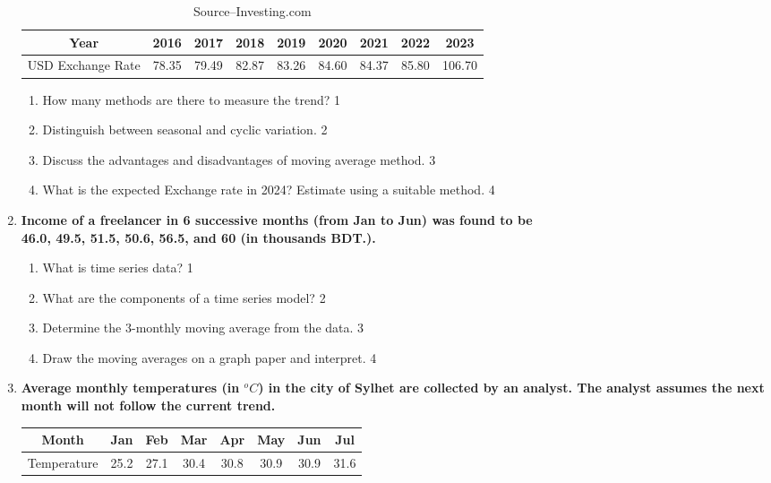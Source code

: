 \documentclass[a4paper,oneside]{book}
\begin{document}
\begin{enumerate}
  \begin{table}[h]
  \centering
\begin{tabular}{c|c|c|c|c|c|c|c|c}
Year & 2016 & 2017 & 2018 & 2019 & 2020 & 2021 & 2022 & 2023 \\ \hline
USD Exchange Rate & 78.35 & 79.49 & 82.87 & 83.26 & 84.60 & 84.37 & 85.80 & 106.70
\end{tabular}
\caption{\label{usdrate}Source--Investing.com}
\end{table}
  
  
  \begin{enumerate}
    \item
	How many methods are there to measure the trend? \hfill 1
    \item
	Distinguish between seasonal and cyclic variation. \hfill 2
    \item  
	Discuss the advantages and disadvantages of moving average method. \hfill 3
    \item
	What is the expected Exchange rate in 2024? Estimate using a suitable method. \hfill 4
  \end{enumerate}

 \item
	  \textbf{Income of a freelancer in 6 successive months (from Jan to Jun) was found to be \\ 46.0, 49.5, 51.5, 50.6, 56.5, and 60 (in thousands BDT.).}
  \begin{enumerate}
    \item
	What is time series data? \hfill 1
    \item
	What are the components of a time series model? \hfill 2
    \item  
	Determine the 3-monthly moving average from the data. \hfill 3
    \item
	Draw the moving averages on a graph paper and interpret. \hfill 4
\end{enumerate}

 \item
	  \textbf{Average monthly temperatures (in $^o C$) in the city of Sylhet are collected by an analyst. The analyst assumes the next month will not follow the current trend.} 
	  
	  \begin{table}[h]
	  \centering
\begin{tabular}{c|c|c|c|c|c|c|c}
Month & Jan & Feb & Mar & Apr & May & Jun & Jul \\ \hline
Temperature & 25.2 & 27.1 & 30.4 & 30.8 & 30.9 & 30.9 & 31.6
\end{tabular}
\end{table}
  

\end{enumerate}
\end{document}
